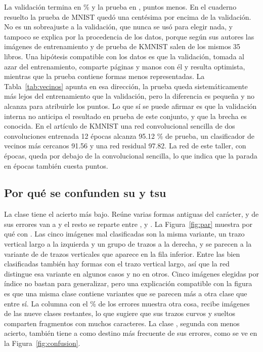 \documentclass[11pt,letterpaper]{article}
\begin{document}
La validación termina en \vaccZ{} \% y la prueba en \accTe, \brecha{} puntos menos. En el cuaderno resuelto la prueba de MNIST quedó una centésima por encima de la validación. No es un sobreajuste a la validación, que nunca se usó para elegir nada, y tampoco se explica por la procedencia de los datos, porque según sus autores las imágenes de entrenamiento y de prueba de KMNIST salen de los mismos 35 libros. Una hipótesis compatible con los datos es que la validación, tomada al azar del entrenamiento, comparte páginas y manos con él y resulta optimista, mientras que la prueba contiene formas menos representadas. La Tabla~\ref{tab:vecinos} apunta en esa dirección, la prueba queda sistemáticamente más lejos del entrenamiento que la validación, pero la diferencia es pequeña y no alcanza para atribuirle los \brecha{} puntos. Lo que sí se puede afirmar es que la validación interna no anticipa el resultado en prueba de este conjunto, y que la brecha es conocida. En el artículo de KMNIST una red convolucional sencilla de dos convoluciones entrenada 12 épocas alcanza 95.12 \% de prueba, un clasificador de vecinos más cercanos 91.56 y una red residual 97.82. La red de este taller, con \epocas{} épocas, queda por debajo de la convolucional sencilla, lo que indica que la parada en \epocas{} épocas también cuesta puntos.

\subsection{Por qué se confunden su y tsu}

La clase \parReal{} tiene el acierto más bajo. Reúne varias formas antiguas del carácter, y de sus \errReal{} errores \parN{} van a \parPred{} y el resto se reparte entre \destB, \destC{} y \destD. La Figura~\ref{fig:par} muestra por qué con \parPred. Las cinco imágenes mal clasificadas son la misma variante, un trazo vertical largo a la izquierda y un grupo de trazos a la derecha, y se parecen a la variante de \parPred{} de trazos verticales que aparece en la fila inferior. Entre las \parReal{} bien clasificadas también hay formas con el trazo vertical largo, así que la red distingue esa variante en algunos casos y no en otros. Cinco imágenes elegidas por índice no bastan para generalizar, pero una explicación compatible con la figura es que una misma clase contiene variantes que se parecen más a otra clase que entre sí. La columna \colMax{} con el \colMaxPct{} \% de los errores muestra otra cosa, \colMax{} recibe imágenes de las nueve clases restantes, lo que sugiere que sus trazos curvos y sueltos comparten fragmentos con muchos caracteres. La clase \clasePeorB, segunda con menos acierto, también tiene a \colMax{} como destino más frecuente de sus errores, como se ve en la Figura~\ref{fig:confusion}.
\end{document}
